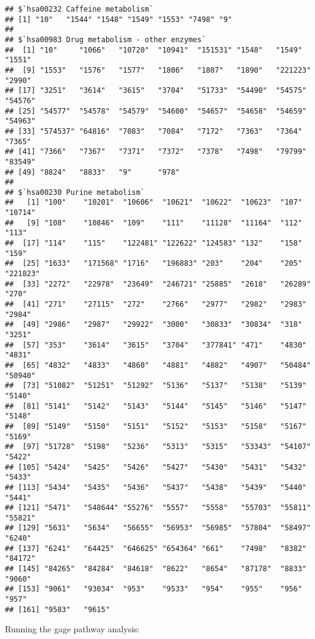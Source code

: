 \documentclass[
]{article}
\newenvironment{Shaded}{\begin{snugshade}}{\end{snugshade}}
\newcommand{\FunctionTok}[1]{\textcolor[rgb]{0.00,0.00,0.00}{#1}}
\newcommand{\NormalTok}[1]{#1}
\newcommand{\OtherTok}[1]{\textcolor[rgb]{0.56,0.35,0.01}{#1}}
\newcommand{\SpecialCharTok}[1]{\textcolor[rgb]{0.00,0.00,0.00}{#1}}
\begin{document}
\begin{verbatim}
## $`hsa00232 Caffeine metabolism`
## [1] "10"   "1544" "1548" "1549" "1553" "7498" "9"   
## 
## $`hsa00983 Drug metabolism - other enzymes`
##  [1] "10"     "1066"   "10720"  "10941"  "151531" "1548"   "1549"   "1551"  
##  [9] "1553"   "1576"   "1577"   "1806"   "1807"   "1890"   "221223" "2990"  
## [17] "3251"   "3614"   "3615"   "3704"   "51733"  "54490"  "54575"  "54576" 
## [25] "54577"  "54578"  "54579"  "54600"  "54657"  "54658"  "54659"  "54963" 
## [33] "574537" "64816"  "7083"   "7084"   "7172"   "7363"   "7364"   "7365"  
## [41] "7366"   "7367"   "7371"   "7372"   "7378"   "7498"   "79799"  "83549" 
## [49] "8824"   "8833"   "9"      "978"   
## 
## $`hsa00230 Purine metabolism`
##   [1] "100"    "10201"  "10606"  "10621"  "10622"  "10623"  "107"    "10714" 
##   [9] "108"    "10846"  "109"    "111"    "11128"  "11164"  "112"    "113"   
##  [17] "114"    "115"    "122481" "122622" "124583" "132"    "158"    "159"   
##  [25] "1633"   "171568" "1716"   "196883" "203"    "204"    "205"    "221823"
##  [33] "2272"   "22978"  "23649"  "246721" "25885"  "2618"   "26289"  "270"   
##  [41] "271"    "27115"  "272"    "2766"   "2977"   "2982"   "2983"   "2984"  
##  [49] "2986"   "2987"   "29922"  "3000"   "30833"  "30834"  "318"    "3251"  
##  [57] "353"    "3614"   "3615"   "3704"   "377841" "471"    "4830"   "4831"  
##  [65] "4832"   "4833"   "4860"   "4881"   "4882"   "4907"   "50484"  "50940" 
##  [73] "51082"  "51251"  "51292"  "5136"   "5137"   "5138"   "5139"   "5140"  
##  [81] "5141"   "5142"   "5143"   "5144"   "5145"   "5146"   "5147"   "5148"  
##  [89] "5149"   "5150"   "5151"   "5152"   "5153"   "5158"   "5167"   "5169"  
##  [97] "51728"  "5198"   "5236"   "5313"   "5315"   "53343"  "54107"  "5422"  
## [105] "5424"   "5425"   "5426"   "5427"   "5430"   "5431"   "5432"   "5433"  
## [113] "5434"   "5435"   "5436"   "5437"   "5438"   "5439"   "5440"   "5441"  
## [121] "5471"   "548644" "55276"  "5557"   "5558"   "55703"  "55811"  "55821" 
## [129] "5631"   "5634"   "56655"  "56953"  "56985"  "57804"  "58497"  "6240"  
## [137] "6241"   "64425"  "646625" "654364" "661"    "7498"   "8382"   "84172" 
## [145] "84265"  "84284"  "84618"  "8622"   "8654"   "87178"  "8833"   "9060"  
## [153] "9061"   "93034"  "953"    "9533"   "954"    "955"    "956"    "957"   
## [161] "9583"   "9615"
\end{verbatim}

Running the gage pathway analysis:

\begin{Shaded}
\end{Shaded}
\end{document}

